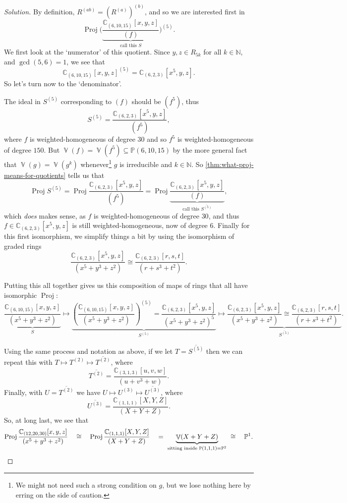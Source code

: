 \documentclass[10pt,notitlepage]{article}
\numberwithin{equation}{subsection}
\DeclareMathOperator{\proj}{Proj}
\DeclareMathOperator{\van}{\mathbb{V}}
\newcommand{\pee}{\mathbb{P}}
\newcommand{\nn}{\mathbb{N}}
\newcommand{\cc}{\mathbb{C}}
\begin{document}
\begin{proof}[Solution]
        \bigskip

        By definition, $R^{(ab)}=(R^{(a)})^{(b)}$, and so we are interested first in
        \[
            \proj\bigg(\underbrace{\frac{\cc_{(6,10,15)}[x,y,z]}{(f)}}_{\text{call this } S}\bigg)^{(5)}.
        \]
        We first look at the `numerator' of this quotient.
        Since $y,z\in R_{5k}$ for all $k\in\nn$, and $\gcd(5,6)=1$, we see that
        \[
            \cc_{(6,10,15)}[x,y,z]^{(5)} = \cc_{(6,2,3)}[x^5,y,z].
        \]
        So let's turn now to the `denominator'.

        The ideal in $S^{(5)}$ corresponding to $(f)$ should be $(f^5)$, thus
        \[
            S^{(5)} = \frac{\cc_{(6,2,3)}[x^5,y,z]}{(f^5)},
        \]
        where $f$ is weighted-homogeneous of degree $30$ and so $f^5$ is weighted-homogeneous of degree $150$.
        But $\van(f)=\van(f^5)\subseteq\pee(6,10,15)$ by the more general fact that $\van(g)=\van(g^k)$ whenever\footnote{%
            We might not need such a strong condition on $g$, but we lose nothing here by erring on the side of caution.
        } $g$ is irreducible and $k\in\nn$.
        So \cref{thm:what-proj-means-for-quotients} tells us that
        \[
            \proj S^{(5)} = \proj\frac{\cc_{(6,2,3)}[x^5,y,z]}{(f^5)} = \proj\underbrace{\frac{\cc_{(6,2,3)}[x^5,y,z]}{(f)}}_{\text{call this }\overline{S^{(5)}}},
        \]
        which \emph{does} makes sense, as $f$ is weighted-homogeneous of degree $30$, and thus $f\in\cc_{(6,2,3)}[x^5,y,z]$ is still weighted-homogeneous, now of degree $6$.
        Finally for this first isomorphism, we simplify things a bit by using the isomorphism of graded rings
        \[
            \frac{\cc_{(6,2,3)}[x^5,y,z]}{(x^5+y^3+z^2)} \cong \frac{\cc_{(6,2,3)}[r,s,t]}{(r+s^3+t^2)}.
        \]

        Putting this all together gives us this composition of maps of rings that all have isomorphic $\proj$:
        \[
            \underbrace{\frac{\cc_{(6,10,15)}[x,y,z]}{(x^5+y^3+z^2)}}_{S} \mapsto \underbrace{\left(\frac{\cc_{(6,10,15)}[x,y,z]}{(x^5+y^3+z^2)}\right)^{(5)} = \frac{\cc_{(6,2,3)}[x^5,y,z]}{(x^5+y^3+z^2)^5}}_{S^{(5)}} \mapsto \underbrace{\frac{\cc_{(6,2,3)}[x^5,y,z]}{(x^5+y^3+z^2)} \cong \frac{\cc_{(6,2,3)}[r,s,t]}{(r+s^3+t^2)}}_{\overline{S^{(5)}}}.
        \]

        \bigskip

        Using the same process and notation as above, if we let $T=\overline{S^{(5)}}$ then we can repeat this with $T \mapsto T^{(2)} \mapsto \overline{T^{(2)}}$, where
        \[
            \overline{T^{(2)}} = \frac{\cc_{(3,1,3)}[u,v,w]}{(u+v^3+w)}.
        \]
        Finally, with $U=\overline{T^{(2)}}$ we have $U \mapsto U^{(3)} \mapsto \overline{U^{(3)}}$, where
        \[
            \overline{U^{(3)}} = \frac{\cc_{(1,1,1)}[X,Y,Z]}{(X+Y+Z)}.
        \]
        So, at long last, we see that
        \[
            \proj\frac{\cc_{(12,20,30)}[x,y,z]}{(x^5+y^3+z^2)} \quad\cong\quad \proj\frac{\cc_{(1,1,1)}[X,Y,Z]}{(X+Y+Z)} \quad=~ \underbrace{\van(X+Y+Z)}_{\text{sitting inside }\pee(1,1,1)=\pee^2} ~\cong\quad \pee^1.\qedhere
        \]
    \end{proof}
\end{document}
